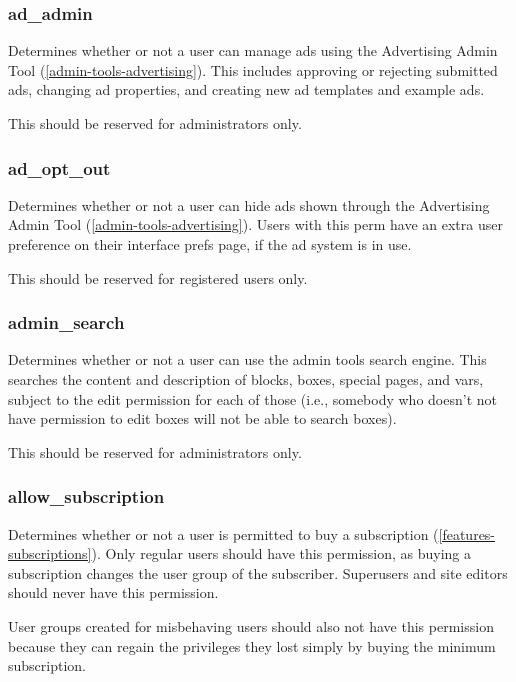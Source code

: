 \subsubsection{ad\_admin}
\label{perm-ad-admin}

Determines whether or not a user can manage ads using the Advertising Admin Tool (\ref{admin-tools-advertising}).  This includes approving or rejecting submitted ads, changing ad properties, and creating new ad templates and example ads.

This should be reserved for administrators only.

\subsubsection{ad\_opt\_out}
\label{perm-ad-opt-out}

Determines whether or not a user can hide ads shown through the Advertising Admin Tool (\ref{admin-tools-advertising}). Users with this perm have an extra user preference on their interface prefs page, if the ad system is in use.

This should be reserved for registered users only.

\subsubsection{admin\_search}
\label{perm-admin-search}

Determines whether or not a user can use the admin tools search engine. This searches the content and description of blocks, boxes, special pages, and vars, subject to the edit permission for each of those (i.e., somebody who doesn't not have permission to edit boxes will not be able to search boxes).

This should be reserved for administrators only.

\subsubsection{allow\_subscription}
\label{perm-allow-subscription}

Determines whether or not a user is permitted to buy a subscription (\ref{features-subscriptions}). Only regular users should have this permission, as buying a subscription changes the user group of the subscriber. Superusers and site editors should never have this permission.

User groups created for misbehaving users should also not have this permission because they can regain the privileges they lost simply by buying the minimum subscription.

